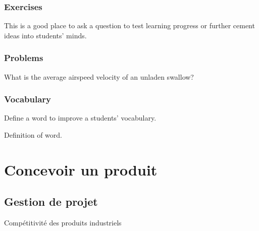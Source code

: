 \documentclass[
	11pt, %
	fleqn, %
	a4paper, %
]{LegrandOrangeBook}
\begin{document}

\section{Exercises}

\begin{exercise} %
	This is a good place to ask a question to test learning progress or further cement ideas into students' minds.
\end{exercise}


\section{Problems}

\begin{problem} %
	What is the average airspeed velocity of an unladen swallow?
\end{problem}


\section{Vocabulary}

Define a word to improve a students' vocabulary.

\begin{vocabulary}[Word] %
	Definition of word.
\end{vocabulary}




\part{Concevoir un produit}


\chapter{Gestion de projet}
\begin{corollary}[S1.3]
Compétitivité des produits industriels
\end{corollary}
\end{document}
